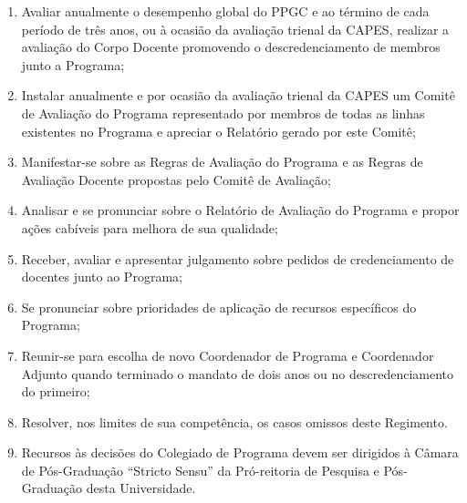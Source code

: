 \documentclass{article}
\begin{document}
\begin{enumerate}
\begin{enumerate}
		\item Avaliar anualmente o desempenho global do PPGC e ao término de cada período de três anos, ou à ocasião da avaliação trienal da CAPES, realizar a avaliação do Corpo Docente promovendo o descredenciamento de membros junto a Programa; %
		\item Instalar anualmente e por ocasião da avaliação trienal da CAPES um Comitê de Avaliação do Programa representado por membros de todas as linhas existentes no Programa e apreciar o Relatório gerado por este Comitê; %
		\item Manifestar-se sobre as Regras de Avaliação do Programa e as Regras de Avaliação Docente propostas pelo Comitê de Avaliação;
		\item Analisar e se pronunciar sobre o Relatório de Avaliação do Programa e propor ações cabíveis para melhora de sua qualidade;
		\item Receber, avaliar e apresentar julgamento sobre pedidos de credenciamento de docentes junto ao Programa;
		\item Se pronunciar sobre prioridades de aplicação de recursos específicos do Programa;
		\item Reunir-se para escolha de novo Coordenador de Programa e Coordenador Adjunto quando terminado o mandato de dois anos ou no descredenciamento do primeiro; %
		\item Resolver, nos limites de sua competência, os casos omissos deste Regimento.
		\item Recursos às decisões do Colegiado de Programa devem ser dirigidos à Câmara de Pós-Graduação ``Stricto Sensu'' da Pró-reitoria de Pesquisa e Pós-Graduação desta Universidade.

	\end{enumerate}
\end{enumerate}
\end{document}
